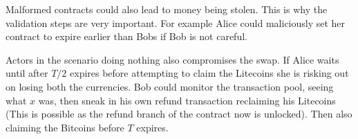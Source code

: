 Malformed contracts could also lead to money being stolen. This is why the validation steps are very important. For example Alice could maliciously set her contract to expire earlier than Bobs if Bob is not careful.

Actors in the scenario doing nothing also compromises the swap. If Alice waits until after $T/2$ expires before attempting to claim the Litecoins she is risking out on losing both the currencies. Bob could monitor the transaction pool, seeing what $x$ was, then sneak in his own refund transaction reclaiming his Litecoins (This is possible as the refund branch of the contract now is unlocked). Then also claiming the Bitcoins before $T$ expires.
